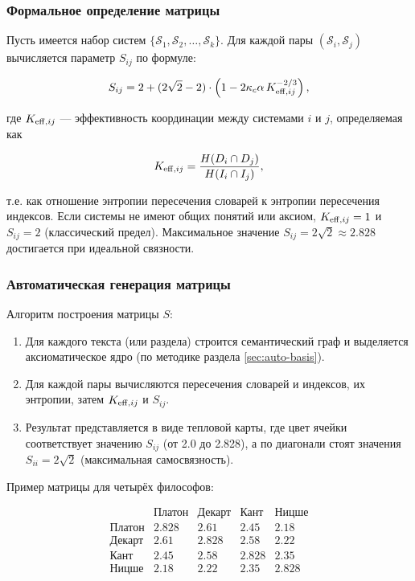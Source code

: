 \documentclass[12pt,a4paper]{article}
\newcommand{\kappac}{\kappa_c}
\begin{document}
	\subsubsection{Формальное определение матрицы}
	
	Пусть имеется набор систем \(\{\mathcal{S}_1, \mathcal{S}_2, \dots, \mathcal{S}_k\}\). Для каждой пары \((\mathcal{S}_i, \mathcal{S}_j)\) вычисляется параметр \(S_{ij}\) по формуле:
	
	\[
	S_{ij} = 2 + (2\sqrt{2} - 2) \cdot \left(1 - 2\kappac \alpha \, \Keff[ij]^{-2/3}\right),
	\]
	
	где \(\Keff[ij]\) — эффективность координации между системами \(i\) и \(j\), определяемая как
	
	\[
	\Keff[ij] = \frac{H(D_i \cap D_j)}{H(I_i \cap I_j)},
	\]
	
	т.е. как отношение энтропии пересечения словарей к энтропии пересечения индексов. Если системы не имеют общих понятий или аксиом, \(\Keff[ij] = 1\) и \(S_{ij} = 2\) (классический предел). Максимальное значение \(S_{ij} = 2\sqrt{2} \approx 2.828\) достигается при идеальной связности.
	
	\subsubsection{Автоматическая генерация матрицы}
	
	Алгоритм построения матрицы \(S\):
	
	\begin{enumerate}
		\item Для каждого текста (или раздела) строится семантический граф и выделяется аксиоматическое ядро (по методике раздела \ref{sec:auto-basis}).
		\item Для каждой пары вычисляются пересечения словарей и индексов, их энтропии, затем \(\Keff[ij]\) и \(S_{ij}\).
		\item Результат представляется в виде тепловой карты, где цвет ячейки соответствует значению \(S_{ij}\) (от 2.0 до 2.828), а по диагонали стоят значения \(S_{ii} = 2\sqrt{2}\) (максимальная самосвязность).
	\end{enumerate}
	
	Пример матрицы для четырёх философов:
	
	\[
	\begin{array}{c|cccc}
		& \text{Платон} & \text{Декарт} & \text{Кант} & \text{Ницше} \\
		\hline
		\text{Платон} & 2.828 & 2.61 & 2.45 & 2.18 \\
		\text{Декарт} & 2.61 & 2.828 & 2.58 & 2.22 \\
		\text{Кант}   & 2.45 & 2.58 & 2.828 & 2.35 \\
		\text{Ницше}  & 2.18 & 2.22 & 2.35 & 2.828 \\
	\end{array}
	\]
	
\end{document}

